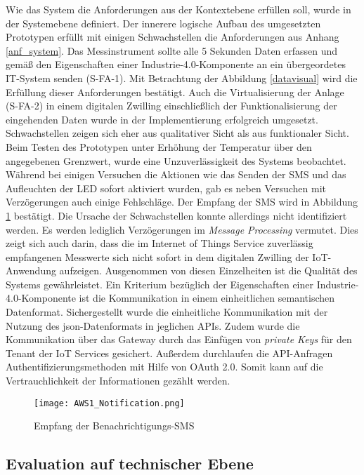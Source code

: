 Wie das System die Anforderungen aus der Kontextebene erfüllen soll, wurde in der Systemebene definiert. Der innerere logische Aufbau des umgesetzten Prototypen erfüllt mit einigen Schwachstellen die Anforderungen aus Anhang \ref{anf_system}.
Das Messinstrument sollte alle 5 Sekunden Daten erfassen und gemäß den Eigenschaften einer Industrie-4.0-Komponente an ein übergeordetes IT-System senden (S-FA-1). Mit Betrachtung der Abbildung \ref{datavisual} wird die Erfüllung dieser Anforderungen bestätigt. Auch die Virtualisierung der Anlage (S-FA-2) in einem digitalen Zwilling einschließlich der Funktionalisierung der eingehenden Daten wurde in der Implementierung erfolgreich umgesetzt. 
Schwachstellen zeigen sich eher aus qualitativer Sicht als aus funktionaler Sicht. Beim Testen des Prototypen unter Erhöhung der Temperatur über den angegebenen Grenzwert, wurde eine Unzuverlässigkeit des Systems beobachtet. Während bei einigen Versuchen die Aktionen wie das Senden der SMS und das Aufleuchten der LED sofort aktiviert wurden, gab es neben Versuchen mit Verzögerungen auch einige Fehlschläge. Der Empfang der SMS wird in Abbildung \ref{awsnoti} bestätigt. Die Ursache der Schwachstellen konnte allerdings nicht identifiziert werden. Es werden lediglich Verzögerungen im \textit{Message Processing} vermutet. Dies zeigt sich auch darin, dass die im Internet of Things Service zuverlässig empfangenen Messwerte sich nicht sofort in dem digitalen Zwilling der IoT-Anwendung aufzeigen. Ausgenommen von diesen Einzelheiten ist die Qualität des Systems gewährleistet. Ein Kriterium bezüglich der Eigenschaften einer Industrie-4.0-Komponente ist die Kommunikation in einem einheitlichen semantischen Datenformat. Sichergestellt wurde die einheitliche Kommunikation mit der Nutzung des \ac{json}-Datenformats in jeglichen APIs. Zudem wurde die Kommunikation über das Gateway durch das Einfügen von \textit{private Keys} für den Tenant der IoT Services gesichert. Außerdem durchlaufen die API-Anfragen Authentifizierungsmethoden mit Hilfe von OAuth 2.0. Somit kann auf die Vertrauchlichkeit der Informationen gezählt werden. 

\begin{figure}[ht]
    \centering
    \texttt{[image: AWS1\_Notification.png]}
    \caption{Empfang der Benachrichtigungs-SMS}
    \label{awsnoti}
\end{figure}

\subsection{Evaluation auf technischer Ebene}

